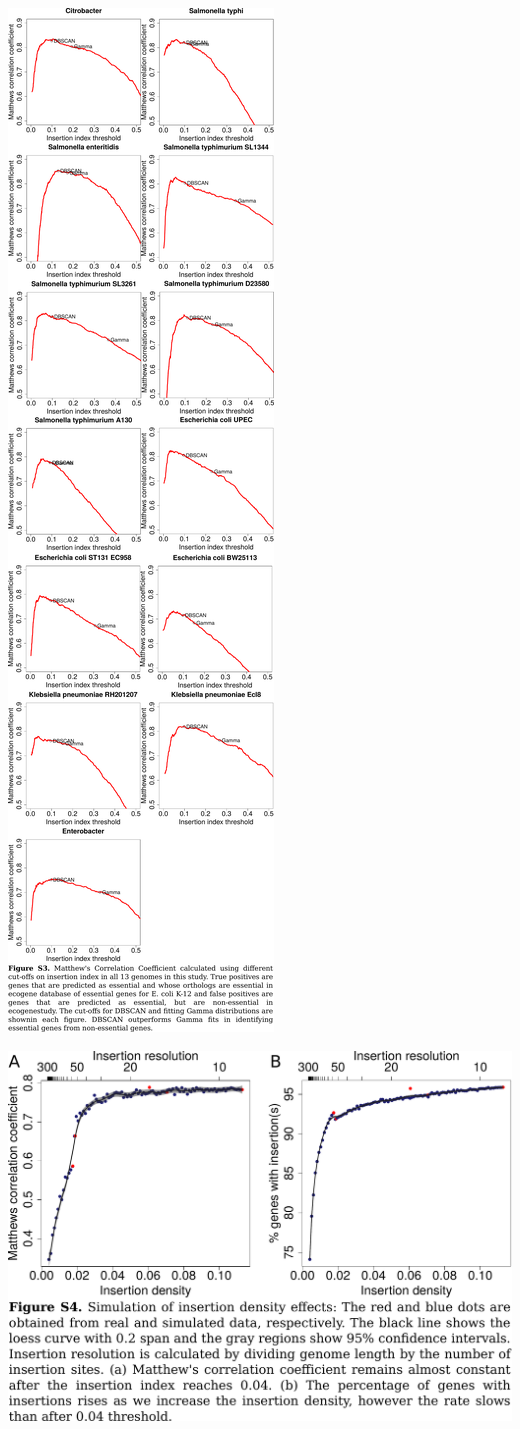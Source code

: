 \documentclass{article}
\newcommand{\Newpage}{\end{preview}\begin{preview}}
\begin{document}
\begin{preview}
\includegraphics{suppl3.pdf}
\Newpage
\includegraphics{suppl4.pdf}

\end{preview}
\end{document}
